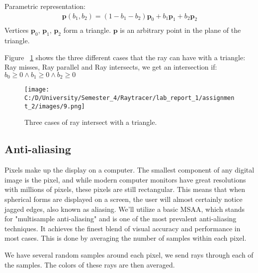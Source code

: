 \documentclass{article}
\begin{document}
	Parametric representation:
	\begin{equation}
		\begin{split}
			\pmb{p}(b_1,b_2) = (1 - b_1 - b_2)\pmb{p}_0 + b_1\pmb{p}_1 + b_2\pmb{p}_2\\
		\end{split}		
	\end{equation}
	Vertices $\pmb{p}_0$, $\pmb{p}_1$, $\pmb{p}_2$ form a triangle. $\pmb{p}$ is an arbitrary point in the plane
	of the triangle.
	
	Figure ~\ref{fig:3} shows the three different cases that the ray can have with a triangle: Ray misses, Ray parallel and Ray intersects, we get an intersection if: 
	\( b_0 \geq
	0 \land b_1\geq
	0 \land b_2 \geq
	0 \)
	
	
	
	\begin{figure}[H]
		\begin{center}
			\texttt{[image: C:/D/University/Semester\_4/Raytracer/lab\_report\_1/assignment\_2/images/9.png]}
			
			\caption{Three cases of ray intersect with a triangle.}
			\label{fig:3}
		\end{center}
	\end{figure}
	
	\subsection{Anti-aliasing}
	Pixels make up the display on a computer. The smallest component of any digital image is the pixel, and while modern computer monitors have great resolutions with millions of pixels, these pixels are still rectangular. This means that when spherical forms are displayed on a screen, the user will almost certainly notice jagged edges, also known as aliasing.
	We'll utilize a basic MSAA, which stands for "multisample anti-aliasing" and is one of the most prevalent anti-aliasing techniques. It achieves the finest blend of visual accuracy and performance in most cases. This is done by averaging the number of samples within each pixel.
	
	We have several random samples around each pixel, we send rays through each of the samples. The colors of these rays are then averaged.
	
\end{document}

